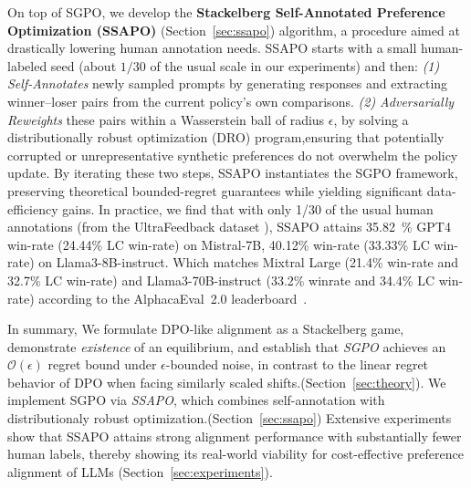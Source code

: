 On top of SGPO, we develop the \textbf{Stackelberg Self-Annotated Preference Optimization (SSAPO)} (Section~\ref{sec:ssapo}) algorithm, a procedure aimed at drastically lowering human annotation needs. SSAPO starts with a small human-labeled seed (about $1/30$ of the usual scale in our experiments) and then: \emph{(1) Self-Annotates} newly sampled prompts by generating responses and extracting winner--loser pairs from the current policy's own comparisons. \emph{(2) Adversarially Reweights} these pairs within a Wasserstein ball of radius $\epsilon$, by solving a distributionally robust optimization (DRO) \citep{Esfahani2018Data} program,ensuring that potentially corrupted or unrepresentative synthetic preferences do not overwhelm the policy update.
By iterating these two steps, SSAPO instantiates the SGPO framework, preserving theoretical bounded-regret guarantees while yielding significant data-efficiency gains. In practice, we find that with only 1/30 of the usual human annotations (from the UltraFeedback dataset \citep{Cui2023Ultrafeedback}), SSAPO attains 35.82~\% GPT4 win-rate (24.44\% LC win-rate) on Mistral-7B, 40.12\% win-rate (33.33\% LC win-rate) on Llama3-8B-instruct. Which matches Mixtral Large (21.4\% win-rate and 32.7\% LC win-rate) and Llama3-70B-instruct (33.2\% winrate and 34.4\% LC win-rate) according to the AlphacaEval~2.0 leaderboard~\citep{dubois2024length}.%

In summary, We formulate DPO-like alignment as a Stackelberg game, demonstrate \emph{existence} of an equilibrium, and establish that \emph{SGPO} achieves an $\mathcal{O}(\epsilon)$ regret bound under $\epsilon$-bounded noise, in contrast to the linear regret behavior of DPO when facing similarly scaled shifts.(Section~\ref{sec:theory}). We implement SGPO via \emph{SSAPO}, which combines self-annotation with distributionaly robust optimization.(Section~\ref{sec:ssapo}) %
 Extensive experiments show that SSAPO attains strong alignment performance with substantially fewer human labels, thereby showing its real-world viability for cost-effective preference alignment of LLMs (Section~\ref{sec:experiments}).

